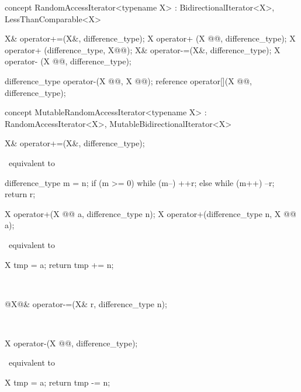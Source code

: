 \documentclass[american,twoside]{book}
\begin{document}
\color{addclr}
\begin{itemdecl}
concept RandomAccessIterator<typename X> : BidirectionalIterator<X>, LessThanComparable<X> {
  X& operator+=(X&, difference_type);
  X  operator+ (X @@, difference_type);
  X  operator+ (difference_type, X@@);
  X& operator-=(X&, difference_type);
  X  operator- (X @@, difference_type);

  difference_type operator-(X @@, X @@);
  reference operator[](X @@, difference_type);
}

concept MutableRandomAccessIterator<typename X>
  : RandomAccessIterator<X>, MutableBidirectionalIterator<X> { }
\end{itemdecl}
\color{black}


\color{addclr}
\begin{itemdecl}
X& operator+=(X&, difference_type);
\end{itemdecl}

\pnum
\effects\
equivalent to
\begin{codeblock}
{ difference_type m = n;
  if (m >= 0) while (m--) ++r;
  else while (m++) --r;
  return r; }
\end{codeblock}

\begin{itemdecl}
X operator+(X @@ a, difference_type n);
X operator+(difference_type n, X @\addedCC{const\&}@ a);
\end{itemdecl}

\pnum
\effects\
equivalent to
\begin{codeblock}
{ X tmp = a;
return tmp += n; }
\end{codeblock}

\pnum
\postcondition\
\tcode{a + n == n + a}

\begin{itemdecl}
@\textcolor{addclr}{X}@& operator-=(X& r, difference_type n);
\end{itemdecl}

\pnum
\returns\
\tcode{r += -n}

\begin{itemdecl}
X operator-(X @\addedCC{const\&}@, difference_type);
\end{itemdecl}

\pnum
\effects\
equivalent to
\begin{codeblock}
{ X tmp = a;
  return tmp -= n; }
\end{codeblock}
\end{document}
